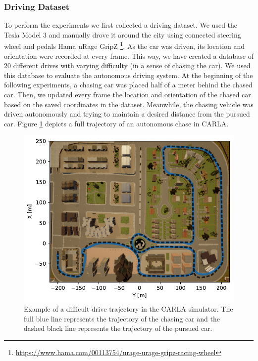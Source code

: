 \documentclass{ctuthesis/ctuthesis}
\begin{document}
\subsubsection{Driving Dataset} \label{s:drivingDataset}
To perform the experiments we first collected a driving dataset. We used the Tesla Model 3 and manually drove it around the city using connected steering wheel and pedals Hama uRage GripZ \footnote{\href{https://www.hama.com/00113754/urage-urage-gripz-racing-wheel}{https://www.hama.com/00113754/urage-urage-gripz-racing-wheel}}. As the car was driven, its location and orientation were recorded at every frame. This way, we have created a database of 20 different drives with varying difficulty (in a sense of chasing the car). We used this database to evaluate the autonomous driving system. At the beginning of the following experiments, a chasing car was placed half of a meter behind the chased car. Then, we updated every frame the location and orientation of the chased car based on the saved coordinates in the dataset. Meanwhile, the chasing vehicle was driven autonomously and trying to maintain a desired distance from the pursued car. Figure \ref{f:trajectory} depicts a full trajectory of an autonomous chase in CARLA.\par




\begin{figure}[]
    \centering
    \includegraphics[width=1\textwidth]{images/trajectory_img_h.pdf}
    \caption{Example of a difficult drive trajectory in the CARLA simulator. The full blue line represents the trajectory of the chasing car and the dashed black line represents the trajectory of the pursued car. }\label{f:trajectory}
\end{figure}
\end{document}
